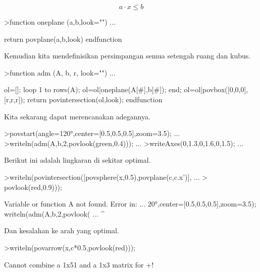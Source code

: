 \documentclass[a4paper,10pt]{article}
\begin{document}
\begin{eulernotebook}
\begin{eulercomment}
\begin{eulercomment}
\begin{eulercomment}
\end{eulercomment}
\begin{eulerformula}
\[
a \cdot x \le b
\]
\end{eulerformula}
\begin{eulerprompt}
>function oneplane (a,b,look="") ...
\end{eulerprompt}
\begin{eulerudf}
    return povplane(a,b,look)
  endfunction
\end{eulerudf}
\begin{eulercomment}
Kemudian kita mendefinisikan persimpangan semua setengah ruang dan
kubus.
\end{eulercomment}
\begin{eulerprompt}
>function adm (A, b, r, look="") ...
\end{eulerprompt}
\begin{eulerudf}
    ol=[];
    loop 1 to rows(A); ol=ol|oneplane(A[#],b[#]); end;
    ol=ol|povbox([0,0,0],[r,r,r]);
    return povintersection(ol,look);
  endfunction
\end{eulerudf}
\begin{eulercomment}
Kita sekarang dapat merencanakan adegannya.
\end{eulercomment}
\begin{eulerprompt}
>povstart(angle=120°,center=[0.5,0.5,0.5],zoom=3.5); ...
>writeln(adm(A,b,2,povlook(green,0.4))); ...
>writeAxes(0,1.3,0,1.6,0,1.5); ...
\end{eulerprompt}
\begin{eulercomment}
Berikut ini adalah lingkaran di sekitar optimal.
\end{eulercomment}
\begin{eulerprompt}
>writeln(povintersection([povsphere(x,0.5),povplane(c,c.x')], ...
>  povlook(red,0.9)));
\end{eulerprompt}
\begin{euleroutput}
  Variable or function A not found.
  Error in:
  ... 20°,center=[0.5,0.5,0.5],zoom=3.5); writeln(adm(A,b,2,povlook( ...
                                                       ^
\end{euleroutput}
\begin{eulercomment}
Dan kesalahan ke arah yang optimal.
\end{eulercomment}
\begin{eulerprompt}
>writeln(povarrow(x,c*0.5,povlook(red)));
\end{eulerprompt}
\begin{euleroutput}
  Cannot combine a 1x51 and a 1x3 matrix for +!

\end{euleroutput}
\end{eulercomment}
\end{eulercomment}
\end{eulernotebook}
\end{document}

